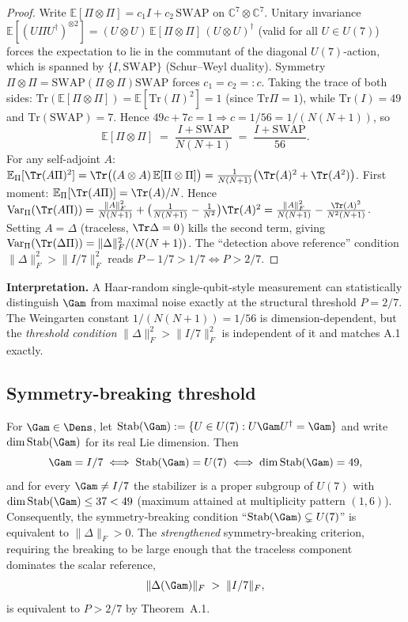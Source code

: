 \begin{proof}
Write $\mathbb{E}[\Pi \otimes \Pi] = c_1 I + c_2\,\mathrm{SWAP}$ on $\mathbb{C}^7 \otimes \mathbb{C}^7$.
Unitary invariance $\mathbb{E}[(U\Pi U^{\dagger})^{\otimes 2}] = (U\otimes U)\,\mathbb{E}[\Pi\otimes\Pi]\,(U\otimes U)^{\dagger}$
(valid for all $U\in U(7)$) forces the expectation to lie in the commutant of the diagonal $U(7)$-action,
which is spanned by $\{I,\mathrm{SWAP}\}$ (Schur--Weyl duality). Symmetry $\Pi\otimes\Pi = \mathrm{SWAP}(\Pi\otimes\Pi)\mathrm{SWAP}$ forces $c_1 = c_2 =: c$.
Taking the trace of both sides:
$\mathrm{Tr}(\mathbb{E}[\Pi\otimes\Pi]) = \mathbb{E}[\mathrm{Tr}(\Pi)^{2}] = 1$ (since $\mathrm{Tr}\Pi = 1$),
while $\mathrm{Tr}(I) = 49$ and $\mathrm{Tr}(\mathrm{SWAP}) = 7$. Hence
$49c + 7c = 1 \Rightarrow c = 1/56 = 1/(N(N+1))$, so
\[
  \mathbb{E}[\Pi \otimes \Pi] \;=\; \frac{I + \mathrm{SWAP}}{N(N+1)} \;=\; \frac{I + \mathrm{SWAP}}{56}.
\]
For any self-adjoint $A$:
$\mathbb{E}_\Pi[\Tr(A\Pi)^2] = \Tr\bigl((A\otimes A)\,\mathbb{E}[\Pi\otimes\Pi]\bigr)
= \tfrac{1}{N(N+1)}\bigl(\Tr(A)^2 + \Tr(A^2)\bigr)$.
First moment: $\mathbb{E}_\Pi[\Tr(A\Pi)] = \Tr(A)/N$. Hence
$\mathrm{Var}_\Pi(\Tr(A\Pi)) = \tfrac{\|A\|_F^2}{N(N+1)} + \bigl(\tfrac{1}{N(N+1)} - \tfrac{1}{N^2}\bigr)\Tr(A)^2
= \tfrac{\|A\|_F^2}{N(N+1)} - \tfrac{\Tr(A)^2}{N^2(N+1)}$.
Setting $A = \Delta$ (traceless, $\Tr\Delta = 0$) kills the second term, giving
$\mathrm{Var}_\Pi(\Tr(\Delta\Pi)) = \|\Delta\|_F^2/(N(N+1))$.
The ``detection above reference'' condition $\|\Delta\|_F^2 > \|I/7\|_F^2$
reads $P - 1/7 > 1/7 \Leftrightarrow P > 2/7$.
\end{proof}

\textbf{Interpretation.} A Haar-random single-qubit-style measurement can
statistically distinguish $\Gam$ from maximal noise exactly at the structural
threshold $P = 2/7$. The Weingarten constant $1/(N(N+1)) = 1/56$ is
dimension-dependent, but the \emph{threshold condition}
$\|\Delta\|_F^2 > \|I/7\|_F^2$ is independent of it and matches A.1 exactly.

\subsection{Symmetry-breaking threshold}
\label{app:pcrit-symmetry}

\begin{theorembox}
For $\Gam \in \Dens$, let $\mathrm{Stab}(\Gam) := \{U \in U(7) : U\Gam U^{\dagger} = \Gam\}$
and write $\dim\mathrm{Stab}(\Gam)$ for its real Lie dimension. Then
\[
  \Gam = I/7
  \;\Longleftrightarrow\;
  \mathrm{Stab}(\Gam) = U(7)
  \;\Longleftrightarrow\;
  \dim\mathrm{Stab}(\Gam) = 49,
\]
and for every $\Gam \neq I/7$ the stabilizer is a proper subgroup of $U(7)$
with $\dim\mathrm{Stab}(\Gam) \leq 37 < 49$ (maximum attained at
multiplicity pattern $(1,6)$). Consequently, the
symmetry-breaking condition
``$\mathrm{Stab}(\Gam) \subsetneq U(7)$'' is equivalent to $\|\Delta\|_F > 0$.
The \emph{strengthened} symmetry-breaking criterion, requiring the breaking
to be large enough that the traceless component dominates the scalar
reference,
\[
  \|\Delta(\Gam)\|_F \;>\; \|I/7\|_F,
\]
is equivalent to $P > 2/7$ by Theorem~A.1.
\end{theorembox}

